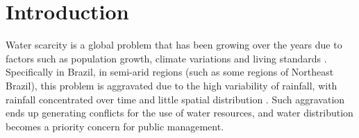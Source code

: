 \documentclass{singlecol}
\theoremstyle{TH}{
\newtheorem{lemma}{Lemma}
\newtheorem{theorem}[lemma]{Theorem}
\newtheorem{corrolary}[lemma]{Corrolary}
\newtheorem{conjecture}[lemma]{Conjecture}
\newtheorem{proposition}[lemma]{Proposition}
\newtheorem{claim}[lemma]{Claim}
\newtheorem{stheorem}[lemma]{Wrong Theorem}
\newtheorem{algorithm}{Algorithm}
}
\theoremstyle{THrm}{
\newtheorem{definition}{Definition}[section]
\newtheorem{question}{Question}[section]
\newtheorem{remark}{Remark}
\newtheorem{scheme}{Scheme}
}
\theoremstyle{THhit}{
\newtheorem{case}{Case}[section]
}
\begin{document}
\maketitle


 \section{Introduction}

	Water scarcity is a global problem that has been growing over the years due to factors such as population growth, climate variations and living standards \citep{HangEtAl2021}. Specifically in Brazil, in semi-arid regions (such as some regions of Northeast Brazil), this problem is aggravated due to the high variability of rainfall, with rainfall concentrated over time and little spatial distribution \citep{SilvaEtAl2019}. Such aggravation ends up generating conflicts for the use of water resources, and water distribution becomes a priority concern for public management.
\end{document}
